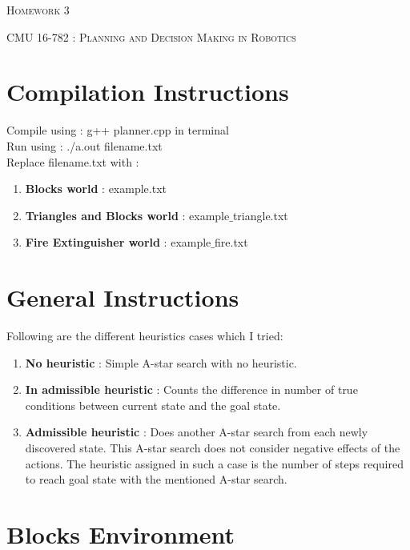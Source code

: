 \documentclass[12pt]{article}
\begin{document}
\begin{center}
  \centerline{\textsc{\LARGE  Homework 3}}
  \vspace{1em}
  \textsc{\large CMU 16-782 : Planning and Decision Making in Robotics} \\
\end{center}

\section{Compilation Instructions}
Compile using : g++ planner.cpp in terminal \\
Run using : ./a.out filename.txt \\
Replace filename.txt with : 
\begin{enumerate}
    \item \textbf{Blocks world} : example.txt
    \item \textbf{Triangles and Blocks world} : example$\_$triangle.txt
    \item \textbf{Fire Extinguisher world} : example$\_$fire.txt
\end{enumerate}

\section{General Instructions}
Following are the different heuristics cases which I tried:
\begin{enumerate}
    \item \textbf{No heuristic} : Simple A-star search with no heuristic.
    \item \textbf{In admissible heuristic} : Counts the difference in number of true conditions between current state and the goal state.
    \item \textbf{Admissible heuristic} : Does another A-star search from each newly discovered state. This A-star search does not consider negative effects of the actions. The heuristic assigned in such a case is the number of steps required to reach goal state with the mentioned A-star search.
\end{enumerate}
 

\newpage
\section{Blocks Environment}
\end{document}
